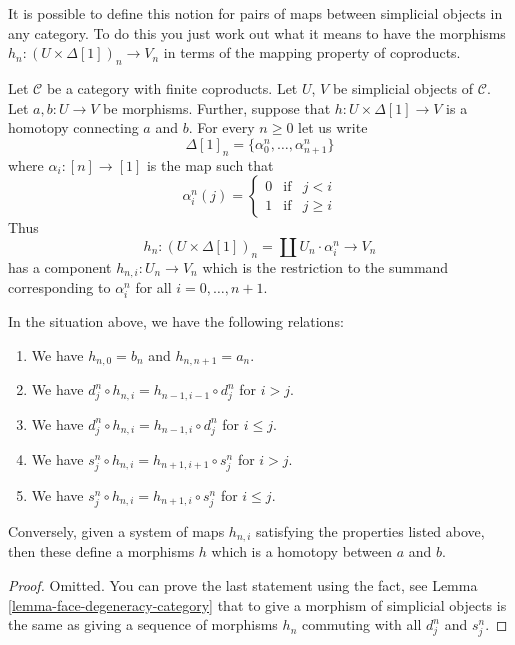 \noindent
It is possible to define this notion for pairs of
maps between simplicial objects in any category.
To do this you just work out what it means to
have the morphisms $h_n : (U \times \Delta[1])_n \to V_n$
in terms of the mapping property of coproducts.

\medskip\noindent
Let $\mathcal{C}$ be a category with finite coproducts.
Let $U$, $V$ be simplicial objects of $\mathcal{C}$.
Let $a, b : U \to V$ be morphisms. Further, suppose
that $h : U \times \Delta[1] \to V$ is a homotopy
connecting $a$ and $b$. For every $n \geq 0$
let us write
$$
\Delta[1]_n = \{\alpha^n_0, \ldots, \alpha^n_{n + 1}\}
$$
where $\alpha_i : [n] \to [1]$ is the map
such that
$$
\alpha^n_i(j)
=
\left\{
\begin{matrix}
0 & \text{if} & j < i\\
1 & \text{if} & j \geq i
\end{matrix}\right.
$$
Thus
$$
h_n : (U \times \Delta[1])_n = \coprod U_n \cdot \alpha^n_i
\longrightarrow
V_n
$$
has a component $h_{n,i} : U_n \to V_n$ which is the restriction
to the summand corresponding to $\alpha^n_i$ for all $i = 0, \ldots, n + 1$.

\begin{lemma}
\label{lemma-relations-homotopy}
In the situation above, we have the following relations:
\begin{enumerate}
\item We have $h_{n, 0} = b_n$ and $h_{n, n + 1} = a_n$.
\item We have $d^n_j \circ h_{n, i} = h_{n - 1, i - 1} \circ d^n_j$
for $i > j$.
\item We have $d^n_j \circ h_{n, i} = h_{n - 1, i} \circ d^n_j$
for $i \leq j$.
\item We have $s^n_j \circ h_{n, i} = h_{n + 1, i + 1} \circ s^n_j$
for $i > j$.
\item We have $s^n_j \circ h_{n, i} = h_{n + 1, i} \circ s^n_j$
for $i \leq j$.
\end{enumerate}
Conversely, given a system of maps $h_{n, i}$ satisfying the
properties listed above, then these define a morphisms
$h$ which is a homotopy between $a$ and $b$.
\end{lemma}

\begin{proof}
Omitted. You can prove the last statement using the fact, 
see Lemma \ref{lemma-face-degeneracy-category} that
to give a morphism of simplicial objects is the
same as giving a sequence of morphisms $h_n$ commuting
with all $d^n_j$ and $s^n_j$.
\end{proof}

